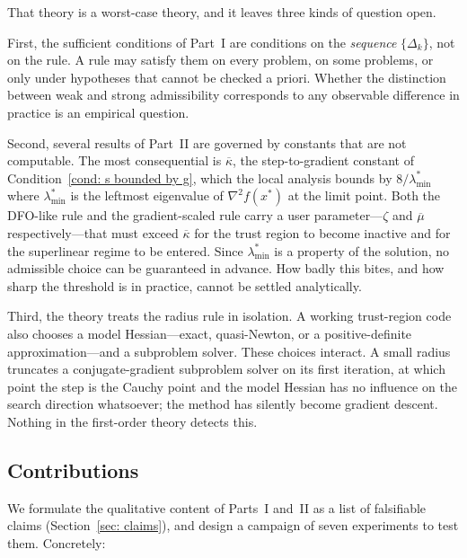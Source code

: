 \documentclass[11pt]{article}
\theoremstyle{plain}
\theoremstyle{definition}
\theoremstyle{remark}
\numberwithin{equation}{section}
\begin{document}
That theory is a worst-case theory, and it leaves three kinds of question open.

First, the sufficient conditions of Part~I are conditions on the \emph{sequence}
$\{\Delta_k\}$, not on the rule. A rule may satisfy them on every problem, on some problems, or
only under hypotheses that cannot be checked a priori. Whether the distinction between weak and
strong admissibility corresponds to any observable difference in practice is an empirical
question.

Second, several results of Part~II are governed by constants that are not computable. The most
consequential is $\overline{\kappa}$, the step-to-gradient constant of
Condition~\ref{cond: s bounded by g}, which the local analysis bounds by $8/\lambda^*_{\min}$
where $\lambda^*_{\min}$ is the leftmost eigenvalue of $\nabla^2 f(x^*)$ at the limit point.
Both the DFO-like rule and the gradient-scaled rule carry a user parameter---$\zeta$ and
$\overline{\mu}$ respectively---that must exceed $\overline{\kappa}$ for the trust region to
become inactive and for the superlinear regime to be entered. Since $\lambda^*_{\min}$ is a
property of the solution, no admissible choice can be guaranteed in advance. How badly this
bites, and how sharp the threshold is in practice, cannot be settled analytically.

Third, the theory treats the radius rule in isolation. A working trust-region code also
chooses a model Hessian---exact, quasi-Newton, or a positive-definite approximation---and a
subproblem solver. These choices interact. A small radius truncates a conjugate-gradient
subproblem solver on its first iteration, at which point the step is the Cauchy point and the
model Hessian has no influence on the search direction whatsoever; the method has silently
become gradient descent. Nothing in the first-order theory detects this.

\subsection{Contributions}

We formulate the qualitative content of Parts~I and~II as a list of falsifiable claims
(Section~\ref{sec: claims}), and design a campaign of seven experiments to test them.
Concretely:
\end{document}
